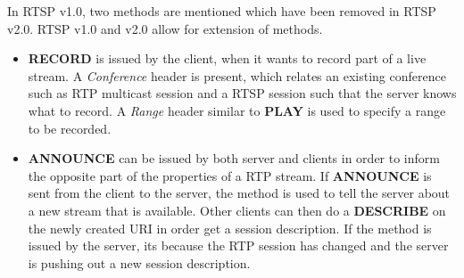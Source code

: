 In RTSP v1.0\citep{RFC2326}, two methods are mentioned which have been removed in RTSP v2.0. RTSP v1.0 and v2.0 allow for extension of methods.
\begin{itemize}
	\item \textbf{RECORD} is issued by the client, when it wants to record part of a live stream. A \textit{Conference} header is present, which relates an existing conference such as RTP multicast session and a RTSP session such that the server knows what to record. A \textit{Range} header similar to \textbf{PLAY} is used to specify a range to be recorded.
	\item \textbf{ANNOUNCE} can be issued by both server and clients in order to inform the opposite part of the properties of a RTP stream. If \textbf{ANNOUNCE} is sent from the client to the server, the method is used to tell the server about a new stream that is available. Other clients can then do a \textbf{DESCRIBE} on the newly created URI in order get a session description. If the method is issued by the server, its because the RTP session has changed and the server is pushing out a new session description.
\end{itemize}


